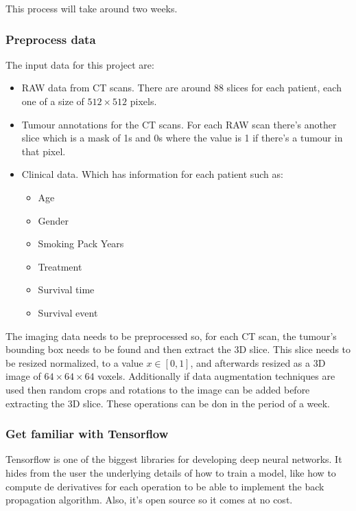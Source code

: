 This process will take around two weeks.

\subsubsection{Preprocess data}

The input data for this project are:
\begin{itemize}
  \item RAW data from CT scans. There are around 88 slices for each patient, each one of 
  a size of \( 512 \times 512 \) pixels.
  \item Tumour annotations for the CT scans. For each RAW scan there's another slice which
  is a mask of 1s and 0s where the value is 1 if there's a tumour in that pixel.
  \item Clinical data. Which has information for each patient such as:
  \begin{itemize}
    \item Age
    \item Gender
    \item Smoking Pack Years
    \item Treatment
    \item Survival time
    \item Survival event
  \end{itemize}
\end{itemize}

The imaging data needs to be preprocessed so, for each CT scan, the tumour's bounding
box needs to be found and then extract the 3D slice. This slice needs to be resized 
normalized, to a value \( x \in [0, 1] \), and afterwards resized as a 3D image of 
\( 64 \times 64 \times 64 \) voxels. Additionally if data augmentation techniques are 
used then random crops and rotations to the image can be added before extracting the
3D slice. These operations can be don in the period of a week.

\subsubsection{Get familiar with Tensorflow}

Tensorflow\cite{neural:Tensorflow} is one of the biggest libraries for developing deep neural 
networks. It hides from the user the underlying details of how to train a model, like how to 
compute de derivatives for each operation to be able to implement the back propagation 
algorithm. Also, it's open source so it comes at no cost.

